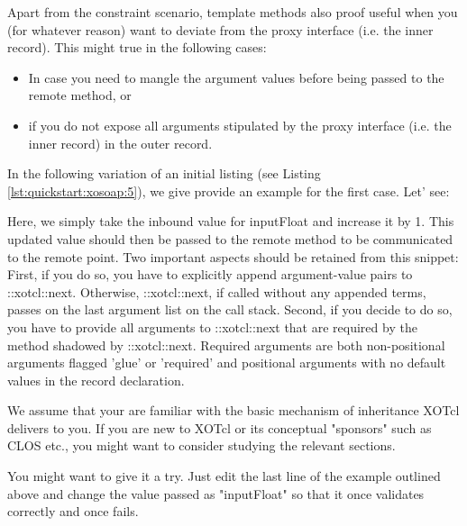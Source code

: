 

Apart from the constraint scenario, template methods also proof useful when you (for whatever reason) 
want to deviate from the proxy interface (i.e. the inner record). This might true in the following cases:
\begin{itemize}
\item In case you need to mangle the argument values before being passed to the remote method, or
\item if you do not expose all arguments stipulated by the proxy interface (i.e. the inner record) in the 
outer record.
\end{itemize}

In the following variation of an initial listing (see Listing \ref{lst:quickstart:xosoap:5}), we give provide an 
example for the first case. Let' see:



Here, we simply take the inbound value for inputFloat and increase it by 1. This updated value should 
then be passed to the remote method to be communicated to the remote point. Two important aspects 
should be retained from this snippet: First, if you do so, you have to explicitly append argument-value 
pairs to ::xotcl::next. Otherwise, ::xotcl::next, if called without any appended terms, passes on the last 
argument list on the call stack. Second, if you decide to do so, you have to provide all arguments 
to ::xotcl::next that are required by the method shadowed by ::xotcl::next. Required arguments are both 
non-positional arguments flagged 'glue' or 'required' and positional arguments with no default values in 
the record declaration.


\begin{hints}
\item We assume that your are familiar with the basic mechanism of inheritance XOTcl delivers to you. If 
you are new to XOTcl or its conceptual "sponsors" such as CLOS etc., you might want to consider 
studying the relevant sections.
\item You might want to give it a try. Just edit the last line of the example outlined above and change the 
value passed as "inputFloat" so that it once validates correctly and once fails.
\end{hints}

